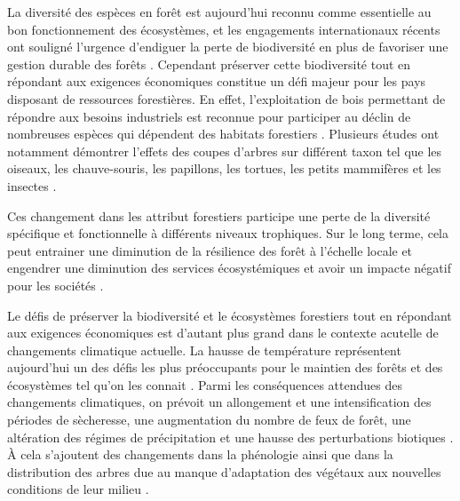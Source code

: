 La diversité des espèces en forêt est aujourd'hui reconnu comme essentielle au bon fonctionnement des écosystèmes, et les engagements internationaux récents ont souligné l'urgence d'endiguer la perte de biodiversité en plus de favoriser une gestion durable des forêts \citep{Scherer-Lorenzen2005ForestDiversity,Parviainen2007Maintenanceconservation}. 
Cependant préserver cette biodiversité tout en répondant aux exigences économiques constitue un défi majeur pour les pays disposant de ressources forestières. 
En effet, l'exploitation de bois permettant de répondre aux besoins industriels est reconnue pour participer au déclin de nombreuses espèces qui dépendent des habitats forestiers \citep{Bengtsson2000Biodiversitydisturbances}. 
Plusieurs études ont notamment démontrer l'effets des coupes d'arbres sur différent taxon tel que les oiseaux, les chauve-souris, les papillons, les tortues, les petits mammifères et les insectes \citep{Summerville2011Managingforest,Currylow2012ShortTermForest,Kaminski2013EffectsForest,Kellner2013Shorttermresponses,Caldwell2019ComparisonBat}. 

Ces changement dans les attribut forestiers participe une perte de la diversité spécifique et fonctionnelle à différents niveaux trophiques. 
Sur le long terme, cela peut entrainer une diminution de la résilience des forêt à l'échelle locale et engendrer une diminution des services écosystémiques et avoir un impacte négatif pour les sociétés \citep{Hooper2012globalsynthesis,Edwards2014Maintainingecosystem}. 



Le défis de préserver la biodiversité et le écosystèmes forestiers tout en répondant aux exigences économiques est d'autant plus grand dans le contexte acutelle de changements climatique actuelle. 
La hausse de température représentent aujourd'hui un des défis les plus préoccupants pour le maintien des forêts et des écosystèmes tel qu'on les connait \citep{McKenney2009Climatechange,Trumbore2015Foresthealth,Seidl2017Forestdisturbances,Messier2022Warningnatural}.  
Parmi les conséquences attendues des changements climatiques, on prévoit un allongement et une intensification des périodes de sècheresse, une augmentation du nombre de feux de forêt, une altération des régimes de précipitation et une hausse des perturbations biotiques \citep{Parmesan2007Influencesspecies,Joyce2013Climatechange,Gatti2021Amazoniacarbon,Heidari2021Effectsclimate}. 
À cela s'ajoutent des changements dans la phénologie ainsi que dans la distribution des arbres due au manque d'adaptation des végétaux aux nouvelles conditions de leur milieu \citep{Aitken2008Adaptationmigration,Chuine2010Whydoes,Zhu2012Failuremigrate,Gray2013Trackingsuitable}.

